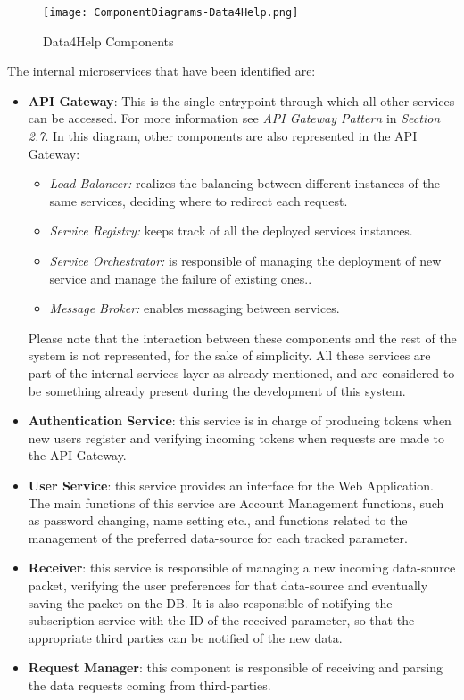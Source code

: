 \FloatBarrier
\begin{figure}[!h]
	\centering
	\texttt{[image: ComponentDiagrams-Data4Help.png]}
	\caption{Data4Help Components}
\end{figure}

\FloatBarrier

The internal microservices that have been identified are:
\begin{itemize}
	\item \textbf{API Gateway}: This is the single entrypoint through which all other services can be accessed. For more information see \textit{API Gateway Pattern} in \textit{Section 2.7}. In this diagram, other components are also represented in the API Gateway:
	\begin{itemize}
		\item \textit{Load Balancer:} realizes the balancing between different instances of the same services, deciding where to redirect each request.
		\item \textit{Service Registry:} keeps track of all the deployed services instances.
		\item \textit{Service Orchestrator:} is responsible of managing the deployment of new service and manage the failure of existing ones..
		\item \textit{Message Broker:} enables messaging between services.
	\end{itemize}
	Please note that the interaction between these components and the rest of the system is not represented, for the sake of simplicity. All these services are part of the internal services layer as already mentioned, and are considered to be something already present during the development of this system.
	\item \textbf{Authentication Service}: this service is in charge of producing tokens when new users register and verifying incoming tokens when requests are made to the API Gateway.
	\item \textbf{User Service}: this service provides an interface for the Web Application. The main functions of this service are Account Management functions, such as password changing, name setting etc., and functions related to the management of the preferred data-source for each tracked parameter.
	\item \textbf{Receiver}: this service is responsible of managing a new incoming data-source packet, verifying the user preferences for that data-source and eventually saving the packet on the DB. It is also responsible of notifying the subscription service with the ID of the received parameter, so that the appropriate third parties can be notified of the new data.
	\item \textbf{Request Manager}: this component is responsible of receiving and parsing the data requests coming from third-parties.
	

\end{itemize}
